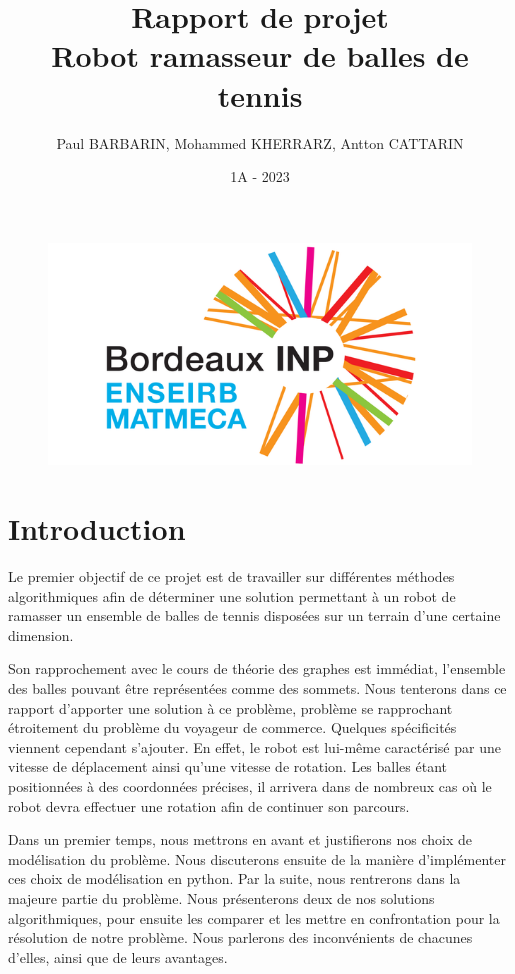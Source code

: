 \documentclass[12pt]{article}
\title{Rapport de projet \\ \textbf{Robot ramasseur de balles de tennis}}
\author{Paul BARBARIN, Mohammed KHERRARZ, Antton CATTARIN}
\date{1A - 2023}
\begin{document}
    \begin{titlepage}

        \begin{figure}
            \centering
            \includegraphics{img/enseirb}
        \end{figure}
        \maketitle

    \end{titlepage}

    \tableofcontents
    \pagebreak
    
    \section{Introduction}

    Le premier objectif de ce projet est de travailler sur différentes méthodes algorithmiques afin de déterminer une solution permettant à un robot de ramasser un ensemble de balles de tennis disposées sur un terrain d'une certaine dimension.

    Son rapprochement avec le cours de théorie des graphes est immédiat, l'ensemble des balles pouvant être représentées comme des sommets. Nous tenterons dans ce rapport d'apporter une solution à ce problème, problème se rapprochant étroitement du problème du voyageur de commerce.
    Quelques spécificités viennent cependant s'ajouter. En effet, le robot est lui-même caractérisé par une vitesse de déplacement ainsi qu'une vitesse de rotation. Les balles étant positionnées à des coordonnées précises, il arrivera dans de nombreux cas où le robot devra effectuer une rotation afin de continuer son parcours.

    Dans un premier temps, nous mettrons en avant et justifierons nos choix de modélisation du problème. Nous discuterons ensuite de la manière d'implémenter ces choix de modélisation en python. Par la suite, nous rentrerons dans la majeure partie du problème. Nous présenterons deux de nos solutions algorithmiques, pour ensuite les comparer et les mettre en confrontation pour la résolution de notre problème. Nous parlerons des inconvénients de chacunes d'elles, ainsi que de leurs avantages.
\end{document}
